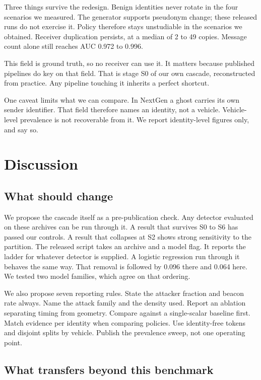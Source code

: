 \documentclass[conference]{IEEEtran}
\begin{document}
Three things survive the redesign.
Benign identities never rotate in the four scenarios we measured.
The generator supports pseudonym change; these released runs do not exercise it.
Policy therefore stays unstudiable in the scenarios we obtained.
Receiver duplication persists, at a median of 2 to 49 copies.
Message count alone still reaches AUC 0.972 to 0.996.


This field is ground truth, so no receiver can use it.
It matters because published pipelines do key on that field.
That is stage S0 of our own cascade, reconstructed from practice.
Any pipeline touching it inherits a perfect shortcut.

One caveat limits what we can compare.
In NextGen a ghost carries its own sender identifier.
That field therefore names an identity, not a vehicle.
Vehicle-level prevalence is not recoverable from it.
We report identity-level figures only, and say so.

\section{Discussion}

\subsection{What should change}

We propose the cascade itself as a pre-publication check.
Any detector evaluated on these archives can be run through it.
A result that survives S0 to S6 has passed our controls.
A result that collapses at S2 shows strong sensitivity to the partition.
The released script takes an archive and a model flag.
It reports the ladder for whatever detector is supplied.
A logistic regression run through it behaves the same way.
That removal is followed by 0.096 there and 0.064 here.
We tested two model families, which agree on that ordering.

We also propose seven reporting rules.
State the attacker fraction and beacon rate always.
Name the attack family and the density used.
Report an ablation separating timing from geometry.
Compare against a single-scalar baseline first.
Match evidence per identity when comparing policies.
Use identity-free tokens and disjoint splits by vehicle.
Publish the prevalence sweep, not one operating point.

\subsection{What transfers beyond this benchmark}
\end{document}
